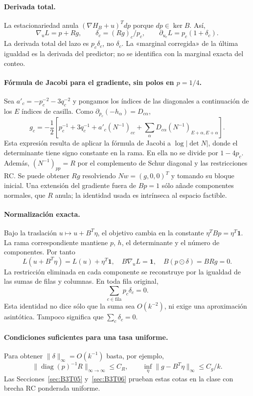 \paragraph{Derivada total.}
La estacionariedad anula $(\nabla H_B+u)^Tdp$ porque $dp\in\ker B$.
Así,
\[
 \boxed{\nabla_uL=p+Rg},\qquad
 \boxed{\delta_c=(Rg)_c/p_c},\qquad
 \partial_{u_c}L=p_c(1+\delta_c).
\]
La derivada total del lazo es $p_c\delta_c$, no $\delta_c$.
La «marginal corregida» de la última igualdad es la derivada del predictor; no se identifica
con la marginal exacta del conteo.

\paragraph{Fórmula de Jacobi para el gradiente, sin polos en $p=1/4$.}
Sea $a'_c=-p_c^{-2}-3q_c^{-2}$ y pongamos los índices de las diagonales a continuación de los $E$
índices de casilla. Como $\partial_{p_c}(-h_\alpha)=D_{c\alpha}$,
\[
 \boxed{g_c=-\frac12\left[
 p_c^{-1}+3q_c^{-1}+a'_c(N^{-1})_{cc}
 +\sum_\alpha D_{c\alpha}(N^{-1})_{E+\alpha,E+\alpha}
 \right].}
\]
Esta expresión resulta de aplicar la fórmula de Jacobi a $\log|\det N|$, donde el determinante
tiene signo constante en la rama. En ella no se divide por $1-4p_c$. Además, $(N^{-1})_{pp}=R$
por el complemento de Schur diagonal y las restricciones RC.
Se puede obtener $Rg$ resolviendo $Nw=(g,0,0)^T$ y tomando su bloque inicial.
Una extensión del gradiente fuera de $Bp=1$ sólo añade componentes normales,
que $R$ anula; la identidad usada es intrínseca al espacio factible.

\paragraph{Normalización exacta.}
Bajo la traslación $u\mapsto u+B^T\eta$, el objetivo cambia en la constante
$\eta^TBp=\eta^T\mathbf1$. La rama correspondiente mantiene $p$, $h$,
el determinante y el número de componentes. Por tanto
\[
 L(u+B^T\eta)=L(u)+\eta^T\mathbf1,
 \quad B\nabla_uL=\mathbf1,
 \quad B(p\odot\delta)=BRg=0.
\]
La restricción eliminada en cada componente se reconstruye por la
igualdad de las sumas de filas y columnas. En toda fila original,
\[
 \boxed{\sum_{c\in\mathrm{fila}}p_c\delta_c=0.}
\]
Esta identidad no dice sólo que la suma sea $O(k^{-2})$, ni exige una aproximación asintótica.
Tampoco significa que $\sum_c\delta_c=0$.

\paragraph{Condiciones suficientes para una tasa uniforme.}
Para obtener $\|\delta\|_\infty=O(k^{-1})$ basta, por ejemplo,
\[
 \|\operatorname{diag}(p)^{-1}R\|_{\infty\to\infty}\le C_R,
 \qquad \inf_\eta\|g-B^T\eta\|_\infty\le C_g/k.
\]
Las Secciones~\ref{sec:B3T05} y~\ref{sec:B3T06} prueban estas cotas en la clase con brecha RC
ponderada uniforme.
